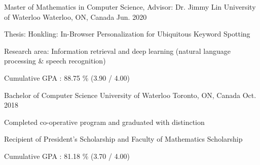 


\begin{cventries}



\cventry
{Master of Mathematics in Computer Science, Advisor: Dr. Jimmy Lin} %
{University of Waterloo} %
{Waterloo, ON, Canada} %
{Jun. 2020} %
{ %
\begin{cvitems}
\item {Thesis: Honkling: In-Browser Personalization for Ubiquitous Keyword Spotting}
\item {Research area: Information retrieval and deep learning (natural language processing \& speech recognition)}
\item {Cumulative GPA : 88.75 \% (3.90 / 4.00)}
\end{cvitems}
}
\cventry
{Bachelor of Computer Science} %
{University of Waterloo} %
{Toronto, ON, Canada} %
{Oct. 2018} %
{ %
\begin{cvitems}
\item {Completed co-operative program and graduated with distinction}
\item {Recipient of President's Scholarship and Faculty of Mathematics Scholarship}
\item {Cumulative GPA : 81.18 \% (3.70 / 4.00)}
\end{cvitems}
}

\end{cventries}
\vspace*{-0.25cm}